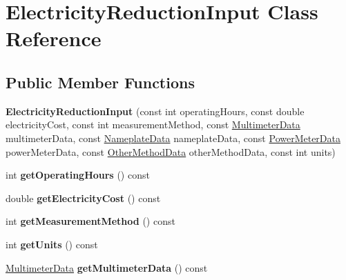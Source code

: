 \hypertarget{class_electricity_reduction_input}{}\section{Electricity\+Reduction\+Input Class Reference}
\label{class_electricity_reduction_input}
\subsection*{Public Member Functions}
\begin{DoxyCompactItemize}
\item 
\mbox{\label{class_electricity_reduction_input_a4bfb56de8fd6b191370d96c4470960a2}} 
{\bfseries Electricity\+Reduction\+Input} (const int operating\+Hours, const double electricity\+Cost, const int measurement\+Method, const \hyperlink{class_multimeter_data}{Multimeter\+Data} multimeter\+Data, const \hyperlink{class_nameplate_data}{Nameplate\+Data} nameplate\+Data, const \hyperlink{class_power_meter_data}{Power\+Meter\+Data} power\+Meter\+Data, const \hyperlink{class_other_method_data}{Other\+Method\+Data} other\+Method\+Data, const int units)
\item 
\mbox{\label{class_electricity_reduction_input_a585b741c3a3e90278ebc42d123d6edf8}} 
int {\bfseries get\+Operating\+Hours} () const
\item 
\mbox{\label{class_electricity_reduction_input_a0f6334d0398e74c943dc27a7f933d8a1}} 
double {\bfseries get\+Electricity\+Cost} () const
\item 
\mbox{\label{class_electricity_reduction_input_a8a69fb38d3c5e84423298694247d4792}} 
int {\bfseries get\+Measurement\+Method} () const
\item 
\mbox{\label{class_electricity_reduction_input_a146159d4cac2232f7ef29e4b2ac58327}} 
int {\bfseries get\+Units} () const
\item 
\mbox{\label{class_electricity_reduction_input_a2a68f5f0b38e54aee9dfcf3ab490d07d}} 
\hyperlink{class_multimeter_data}{Multimeter\+Data} {\bfseries get\+Multimeter\+Data} () const

\end{DoxyCompactItemize}
